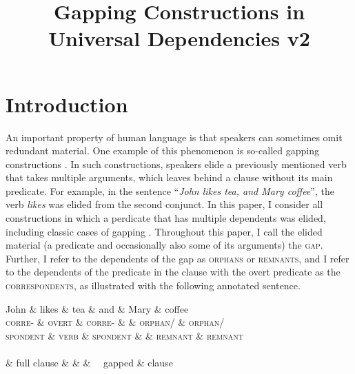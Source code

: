 \documentclass[lucida,biblatex]{sp} %
\title{Gapping Constructions in Universal Dependencies v2}
\author{%
  \spauthor{Sebastian Schuster\\ \today}
}
\begin{document}

\maketitle





\section{Introduction}

An important property of human language is that speakers can sometimes 
omit redundant material. One example of this phenomenon is so-called 
gapping constructions \parencite{Ross1970}. In such constructions, speakers elide a 
previously mentioned verb that takes multiple arguments, which leaves behind 
a clause without its main predicate. For example, in the sentence ``\textit{John likes tea, 
and Mary coffee}'', the verb \textit{likes} was elided from the second conjunct. 
In this paper, I consider all constructions in which 
a perdicate that has multiple dependents was elided, including classic cases of gapping 
\citep{Ross1970}.
Throughout this paper, I call the elided material 
(a predicate and occasionally also some of its arguments) the \textsc{gap}. Further, I refer 
to the dependents of the gap as \textsc{orphans} or \textsc{remnants}, and I refer to 
the dependents of the predicate in the clause with the overt predicate as the 
\textsc{correspondents}, as illustrated with the following annotated sentence.

\begin{center}
\begin{dependency}
    \begin{deptext}[column sep=-0.02cm]
      John \& likes \& tea \& and \& Mary \& coffee \\
      \textsc{corre-} \& \textsc{overt} \& \textsc{corre-} \& \& \textsc{orphan}/ \& \textsc{orphan}/ \\
      \textsc{spondent} \& \textsc{verb} \& \textsc{spondent}  \& \& \textsc{remnant} \& \textsc{remnant}  \\ \null \\ \& {\color{blue} \sc full clause} \& \& \& {\color{blue} \sc  \ \ gapped} \& {\color{blue} \sc clause \ \ }  \\
    \end{deptext}
  \end{dependency}
\end{center}
\end{document}
